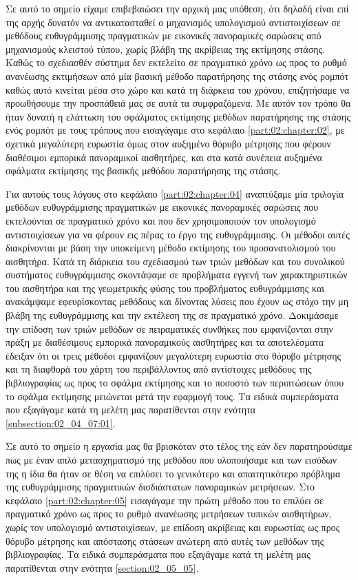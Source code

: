 Σε αυτό το σημείο είχαμε επιβεβαιώσει την αρχική μας υπόθεση, ότι δηλαδή είναι
επί της αρχής δυνατόν να αντικατασταθεί ο μηχανισμός υπολογισμού αντιστοιχίσεων
σε μεθόδους ευθυγράμμισης πραγματικών με εικονικές πανοραμικές σαρώσεις από
μηχανισμούς κλειστού τύπου, χωρίς βλάβη της ακρίβειας της εκτίμησης στάσης.
Καθώς το σχεδιασθέν σύστημα δεν εκτελείτο σε πραγματικό χρόνο ως προς το ρυθμό
ανανέωσης εκτιμήσεων από μία βασική μέθοδο παρατήρησης της στάσης ενός ρομπότ
καθώς αυτό κινείται μέσα στο χώρο και κατά τη διάρκεια του χρόνου, επιζητήσαμε
να προωθήσουμε την προσπάθειά μας σε αυτά τα συμφραζόμενα. Με αυτόν τον τρόπο
θα ήταν δυνατή η ελάττωση του σφάλματος εκτίμησης μεθόδων παρατήρησης της
στάσης ενός ρομπότ με τους τρόπους που εισαγάγαμε στο κεφάλαιο
\ref{part:02:chapter:02}, με σχετικά μεγαλύτερη ευρωστία όμως στον αυξημένο
θόρυβο μέτρησης που φέρουν διαθέσιμοι εμπορικά πανοραμικοί αισθητήρες, και στα
κατά συνέπεια αυξημένα σφάλματα εκτίμησης της βασικής μεθόδου παρατήρησης της
στάσης.

Για αυτούς τους λόγους στο κεφάλαιο \ref{part:02:chapter:04} αναπτύξαμε μία
τριλογία μεθόδων ευθυγράμμισης πραγματικών με εικονικές πανοραμικές σαρώσεις
που εκτελούνται σε πραγματικό χρόνο και που δεν χρησιμοποιούν τον υπολογισμό
αντιστοιχίσεων για να φέρουν εις πέρας το έργο της ευθυγράμμισης. Οι μέθοδοι
αυτές διακρίνονται με βάση την υποκείμενη μέθοδο εκτίμησης του προσανατολισμού
του αισθητήρα. Κατά τη διάρκεια του σχεδιασμού των τριών μεθόδων και του
συνολικού συστήματος ευθυγράμμισης σκοντάψαμε σε προβλήματα εγγενή των
χαρακτηριστικών του αισθητήρα και της γεωμετρικής φύσης του προβλήματος
ευθυγράμμισης και ανακάμψαμε εφευρίσκοντας μεθόδους και δίνοντας λύσεις που
έχουν ως στόχο την μη βλάβη της ευθυγράμμισης και την εκτέλεση της σε
πραγματικό χρόνο. Δοκιμάσαμε την επίδοση των τριών μεθόδων σε πειραματικές
συνθήκες που εμφανίζονται στην πράξη με διαθέσιμους εμπορικά πανοραμικούς
αισθητήρες και τα αποτελέσματα έδειξαν ότι οι τρεις μέθοδοι εμφανίζουν
μεγαλύτερη ευρωστία στο θόρυβο μέτρησης και τη διαφθορά του χάρτη του
περιβάλλοντος από αντίστοιχες μεθόδους της βιβλιογραφίας ως προς το σφάλμα
εκτίμησης και το ποσοστό των περιπτώσεων όπου το σφάλμα εκτίμησης μειώνεται
μετά την εφαρμογή τους. Τα ειδικά συμπεράσματα που εξαγάγαμε κατά τη μελέτη
μας παρατίθενται στην ενότητα \ref{subsection:02_04_07:01}.

Σε αυτό το σημείο η εργασία μας θα βρισκόταν στο τέλος της εάν δεν
παρατηρούσαμε πως με έναν απλό μετασχηματισμό της μεθόδου που υλοποιήσαμε και
των εισόδων της η ίδια θα ήταν σε θέση να επιλύσει το γενικότερο και
απαιτητικότερο πρόβλημα της ευθυγράμμισης πραγματικών δισδιάστατων πανοραμικών
μετρήσεων. Στο κεφάλαιο \ref{part:02:chapter:05} εισαγάγαμε την πρώτη μέθοδο
που το επιλύει σε πραγματικό χρόνο ως προς το ρυθμό ανανέωσης μετρήσεων τυπικών
αισθητήρων, χωρίς τον υπολογισμό αντιστοιχίσεων, με επίδοση ακρίβειας και
ευρωστίας ως προς θόρυβο μέτρησης και απόστασης στάσεων ανώτερη από αυτές των
μεθόδων της βιβλιογραφίας. Τα ειδικά συμπεράσματα που εξαγάγαμε κατά τη μελέτη
μας παρατίθενται στην ενότητα \ref{section:02_05_05}.
